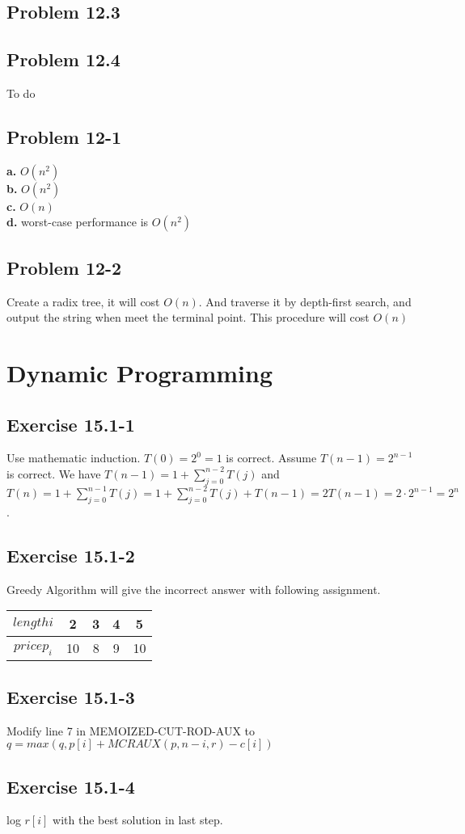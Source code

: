 \documentclass[12pt]{article}
\theoremstyle{definition}
\theoremstyle{remark}
\begin{document}
\subsection*{Problem 12.3}
\subsection*{Problem 12.4}
To do
\subsection*{Problem 12-1}
\textbf{a.} $O(n^2)$\\
\textbf{b.} $O(n^2)$\\
\textbf{c.} $O(n)$\\
\textbf{d.} worst-case performance is $O(n^2)$
\subsection*{Problem 12-2}
Create a radix tree, it will cost $O(n)$. And traverse it by depth-first search, and output the string when meet the terminal point. This procedure will cost $O(n)$
\section{Dynamic Programming}
\subsection*{Exercise 15.1-1}
Use mathematic induction. $T(0)=2^0=1$ is correct. Assume $T(n-1)=2^{n-1}$ is correct. We have $T(n-1)=1+\sum_{j=0}^{n-2}T(j)$ and $T(n)=1+\sum_{j=0}^{n-1}T(j)=1+\sum_{j=0}^{n-2}T(j)+T(n-1)=2T(n-1)=2\cdot 2^{n-1}=2^n$.
\subsection*{Exercise 15.1-2}
Greedy Algorithm will give the incorrect answer with following assignment.
\begin{tabular}{c|c|c|c|c}\hline
$length i$ & 2 & 3 & 4 & 5\\ \hline
$price p_i$ & 10 & 8 & 9 & 10\\ \hline
\end{tabular}
\subsection*{Exercise 15.1-3}
Modify line 7 in MEMOIZED-CUT-ROD-AUX to $q=max(q,p[i]+MCRAUX(p,n-i,r)-c[i])$
\subsection*{Exercise 15.1-4}
log $r[i]$ with the best solution in last step.
\end{document}
